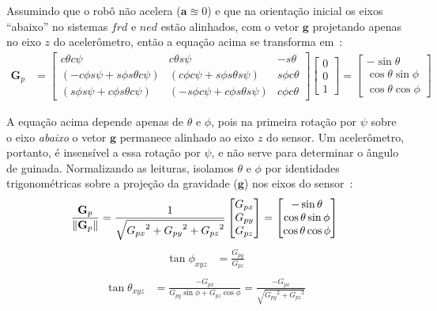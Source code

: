 Assumindo que o robô não acelera (\(\mathbf{a}\approxeq0\)) e que na orientação inicial os eixos ``abaixo'' no sistemas \(frd\) e \(ned\) estão alinhados, com o vetor \(\mathbf{g}\) projetando apenas no eixo \(z\) do acelerômetro, então a equação acima se transforma em~\cite{freescaleAN3461}:
\begin{align}
    {\mathbf{G}}_p &= \begin{bmatrix}
        c\theta c\psi   & c\theta s\psi & -s\theta    \\
        \left(-c\phi s\psi + s\phi s\theta c\psi \right)
        &  \left( c\phi c\psi + s\phi s\theta s\psi \right)
        &  s\phi c\theta                                 \\
        \left( s\phi s\psi + c\phi s\theta c\psi \right)
        &  \left( -s\phi c\psi + c\phi s\theta s\psi \right)
        & c\phi c\theta
    \end{bmatrix} \begin{bmatrix} 0 \\ 0 \\ 1 \end{bmatrix} = \begin{bmatrix} -\sin{\theta} \\ \cos{\theta}\sin{\phi} \\ \cos{\theta}\cos{\phi} \end{bmatrix}
\end{align}

A equação acima depende apenas de \(\theta\) e \(\phi\), pois na primeira rotação por \(\psi\) sobre o eixo \emph{abaixo} o vetor \(\mathbf{g}\) permanece alinhado ao eixo \(z\) do sensor. Um acelerômetro, portanto, é insensível a essa rotação por \(\psi\), e não serve para determinar o ângulo de guinada\footnotemark{}. Normalizando as leituras, isolamos \(\theta\) e \(\phi\) por identidades trigonométricas sobre a projeção da gravidade (\(\mathbf{g}\)) nos eixos do sensor~\cite{freescaleAN3461}:
\begin{equation}
    \frac{{\mathbf{G}}_{p}}{\lVert{{\mathbf{G}}_{p}}\rVert} =
    \frac{1}{\sqrt{{{{G}_{px}}^{2}} + {{{G}_{py}}^{2}} + {{G}_{pz}}^{2}}} \begin{bmatrix} {G}_{px} \\ {G}_{py} \\ {G}_{pz} \end{bmatrix}
    = \begin{bmatrix} -\sin{\theta} \\ \cos{\theta}\sin{\phi} \\ \cos{\theta}\cos{\phi} \end{bmatrix} \\
\end{equation}
\begin{align}
    \tan{\phi}_{xyz} &= \frac{G_{py}}{G_{pz}} \\
\end{align}
\begin{align}
    \tan{\theta}_{xyz} &= \frac{-G_{px}}{{G_{py}\sin{\phi}}+{{{G}_{pz}}\cos{\phi}}} = \frac{-G_{px}}{\sqrt{{{G_{py}}^{2}}+{{{G}_{pz}}^2}}}
\end{align}


